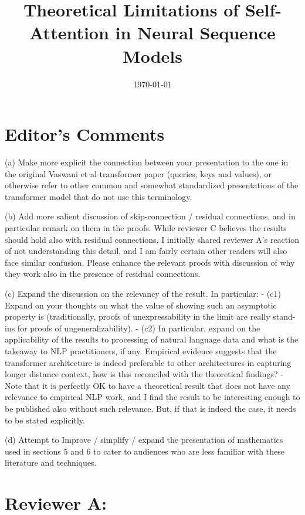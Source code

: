 \documentclass[11pt,a4paper]{article}
\title{Theoretical Limitations of Self-Attention in Neural Sequence Models}
\date{\today}
\begin{document}
\maketitle 

\section{Editor's Comments}

(a) Make more explicit the connection between your presentation to the one
in the original Vaswani et al transformer paper (queries, keys and values),
or otherwise refer to other common and somewhat standardized presentations
of the transformer model that do not use this terminology.

(b) Add more salient discussion of skip-connection / residual connections,
and in particular remark on them in the proofs. While reviewer C believes
the results should hold also with residual connections, I initially shared
reviewer A's reaction of not understanding this detail, and I am fairly
certain other readers will also face similar confusion. Please enhance the
relevant proofs with discussion of why they work also in the presence of
residual connections.

(c) Expand the discussion on the relevancy of the result. In particular:
- (c1) Expand on your thoughts on what the value of showing such an
asymptotic property is (traditionally, proofs of unexpressability in the
limit are really stand-ins for proofs of ungeneralizability).
- (c2) In particular, expand on the applicability of the results to
processing of natural language data and what is the takeaway to NLP
practitioners, if any. Empirical evidence suggests that the transformer
architecture is indeed preferable to other architectures in capturing longer
distance context, how is this reconciled with the theoretical findings?
- Note that it is perfectly OK to have a theoretical result that does not
have any relevance to empirical NLP work, and I find the result to be
interesting enough to be published also without such relevance. But, if that
is indeed the case, it needs to be stated explicitly.

(d) Attempt to Improve / simplify / expand the presentation of mathematics
used in sections 5 and 6 to cater to audiences who are less familiar with
these literature and techniques.

\section{Reviewer A:}
\end{document}

